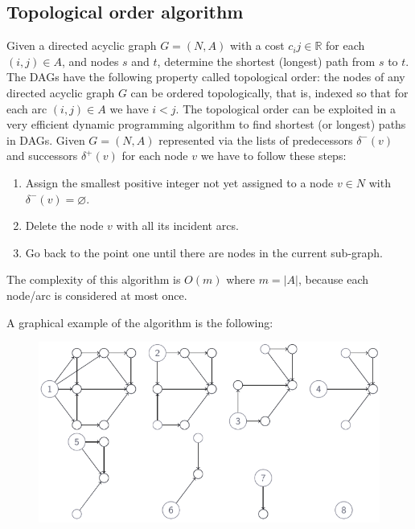 \documentclass[12pt, a4paper]{report}
\newtheorem[style=M,bodystyle=\normalfont]{proposition}{Proposition}
\newtheorem[style=M,bodystyle=\normalfont]{theorem}{Theorem}
\newtheorem[style=M,bodystyle=\normalfont]{corollary}{Corollary}
\newtheorem[style=M,bodystyle=\normalfont]{lemma}{Lemma}
\newtheorem[style=M,bodystyle=\normalfont]{definition}{Definition}
\begin{document}
    \subsection{Topological order algorithm}
    Given a directed acyclic graph $G = (N,A)$ with a cost $c_ij \in \mathbb{R}$ for each $(i,j) \in A$, and nodes $s$ and $t$, determine the shortest (longest) path from $s$ to $t$. 
    The DAGs have the following property called topological order: the nodes of any directed acyclic graph $G$ can be ordered topologically, that is, indexed so that for each arc $(i,j) \in A$ we have $i < j$. 
    The topological order can be exploited in a very efficient dynamic programming algorithm to find shortest (or longest) paths in DAGs. Given $G = (N,A)$ represented via the lists of predecessors
    $\delta^{-}(v)$ and successors $\delta^{+}(v)$ for each node $v$ we have to follow these steps: 
    \begin{enumerate}
        \item Assign the smallest positive integer not yet assigned to a node $v \in N$ with $\delta^{-}(v)=\varnothing$. 
        \item Delete the node $v$ with all its incident arcs. 
        \item Go back to the point one until there are nodes in the current sub-graph. 
    \end{enumerate}
    The complexity of this algorithm is $O(m)$ where $m = \left\lvert A \right\rvert $, because each node/arc is considered at most once. 
    \begin{example}
        A graphical example of the algorithm is the following: 
        \begin{figure}[H]
            \centering
            \includegraphics[width=0.8\linewidth]{images/spath.png}
        \end{figure}
    \end{example}
\end{document}
